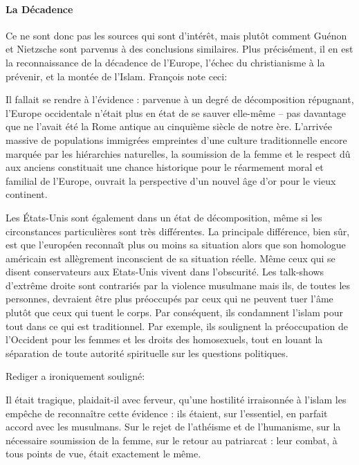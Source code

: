 \paragraph{La Décadence}


Ce ne sont donc pas les sources qui sont d'intérêt, mais plutôt comment Guénon et Nietzsche sont parvenus à des conclusions similaires. Plus précisément, il en est la reconnaissance de la décadence de l'Europe, l'échec du christianisme à la prévenir, et la montée de l'Islam. François note ceci:

\begin{quotex}
Il fallait se rendre à l'évidence : parvenue à un degré de décomposition répugnant, l'Europe occidentale n'était plus en état de se sauver elle-même -- pas davantage que ne l'avait été la Rome antique au cinquième siècle de notre ère. L'arrivée massive de populations immigrées empreintes d'une culture traditionnelle encore marquée par les hiérarchies naturelles, la soumission de la femme et le respect dû aux anciens constituait une chance historique pour le réarmement moral et familial de l'Europe, ouvrait la perspective d'un nouvel âge d'or pour le vieux continent.
\end{quotex}


Les États-Unis sont également dans un état de décomposition, même si les circonstances particulières sont très différentes. La principale dif\-fé\-rence, bien sûr, est que l'européen reconnaît plus ou moins sa situation alors que son homologue américain est allègrement inconscient de sa situation réelle. Même ceux qui se disent conservateurs aux Etats-Unis vivent dans l'obscurité. Les talk-shows d'extrême droite sont contrariés par la violence musulmane mais ils, de toutes les personnes, devraient être plus préoccupés par ceux qui ne peuvent tuer l'âme plutôt que ceux qui tuent le corps. Par conséquent, ils condamnent l'islam pour tout dans ce qui est traditionnel. Par exemple, ils soulignent la préoccupation de l'Occident pour les femmes et les droits des homosexuels, tout en louant la séparation de toute autorité spirituelle sur les questions politiques.

Rediger a ironiquement souligné:

\begin{quotex}
Il était tragique, plaidait-il avec ferveur, qu'une hostilité irraisonnée à l'islam les empêche de reconnaître cette évidence : ils étaient, sur l'essentiel, en parfait accord avec les musulmans. Sur le rejet de l'athéisme et de l'humanisme, sur la nécessaire soumission de la femme, sur le retour au patriarcat : leur combat, à tous points de vue, était exactement le même.
\end{quotex}


